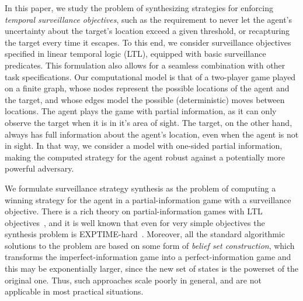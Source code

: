 In this paper, we study the problem of synthesizing strategies for enforcing \emph{temporal surveillance objectives}, such as the requirement to never let the agent's uncertainty about the target's location exceed a given threshold, or recapturing the target every time it escapes. To this end, we consider surveillance objectives specified in linear temporal logic (LTL), equipped with basic surveillance predicates. This formulation also allows for a seamless combination with other task specifications. Our computational model is that of a two-player game played on a finite graph, whose nodes represent the possible locations of the agent and the target, and whose edges model the possible (deterministic) moves between locations. The agent plays the game with partial information, as it can only observe the target when  it is in it's area of sight. The target, on the other hand, always has full information about the agent's location, even when the agent is not in sight. In that way, we consider a model with one-sided partial information, making the computed strategy for the agent robust against a potentially more powerful adversary. 

We formulate surveillance strategy synthesis as the problem of computing a winning strategy for the agent in a partial-information game with a surveillance objective. There is a rich theory on partial-information games with LTL objectives~\cite{DoyenR11,Chatterjee2013}, and it is well known that even for very simple objectives the synthesis problem is EXPTIME-hard~\cite{Reif84,BerwangerD08}. Moreover, all the standard algorithmic solutions to the problem are based on some form of \emph{belief set construction}, which transforms the imperfect-information game into a perfect-information game and this may be exponentially larger, since the new set of states is the powerset of the original one. Thus, such approaches scale poorly in general, and are not applicable in most practical situations.

